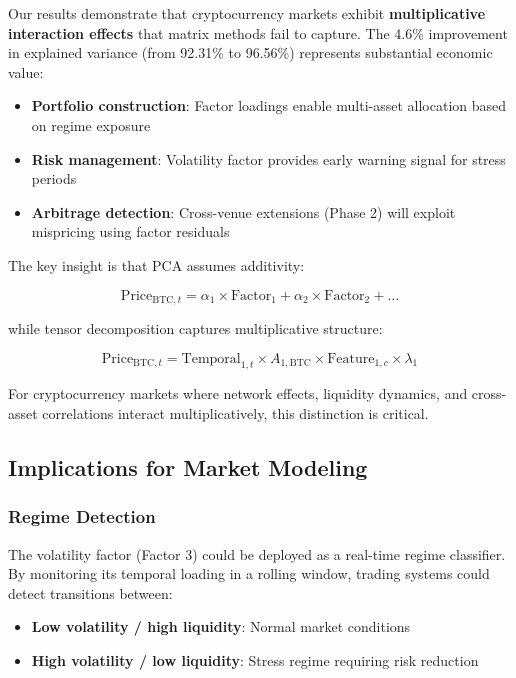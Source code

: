 \documentclass{article}
\begin{document}
Our results demonstrate that cryptocurrency markets exhibit \textbf{multiplicative interaction effects} that matrix methods fail to capture. The 4.6\% improvement in explained variance (from 92.31\% to 96.56\%) represents substantial economic value:

\begin{itemize}[leftmargin=*]
    \item \textbf{Portfolio construction}: Factor loadings enable multi-asset allocation based on regime exposure
    \item \textbf{Risk management}: Volatility factor provides early warning signal for stress periods
    \item \textbf{Arbitrage detection}: Cross-venue extensions (Phase 2) will exploit mispricing using factor residuals
\end{itemize}

The key insight is that PCA assumes additivity:

$$\mathrm{Price}_{\mathrm{BTC},t} = \alpha_1 \times \mathrm{Factor}_1 + \alpha_2 \times \mathrm{Factor}_2 + \ldots$$

while tensor decomposition captures multiplicative structure:

$$\mathrm{Price}_{\mathrm{BTC},t} = \mathrm{Temporal}_{1,t} \times A_{1,\mathrm{BTC}} \times \mathrm{Feature}_{1,c} \times \lambda_1$$

For cryptocurrency markets where network effects, liquidity dynamics, and cross-asset correlations interact multiplicatively, this distinction is critical.

\subsection{Implications for Market Modeling}

\subsubsection{Regime Detection}

The volatility factor (Factor 3) could be deployed as a real-time regime classifier. By monitoring its temporal loading in a rolling window, trading systems could detect transitions between:

\begin{itemize}[leftmargin=*]
    \item \textbf{Low volatility / high liquidity}: Normal market conditions
    \item \textbf{High volatility / low liquidity}: Stress regime requiring risk reduction
\end{itemize}
\end{document}

